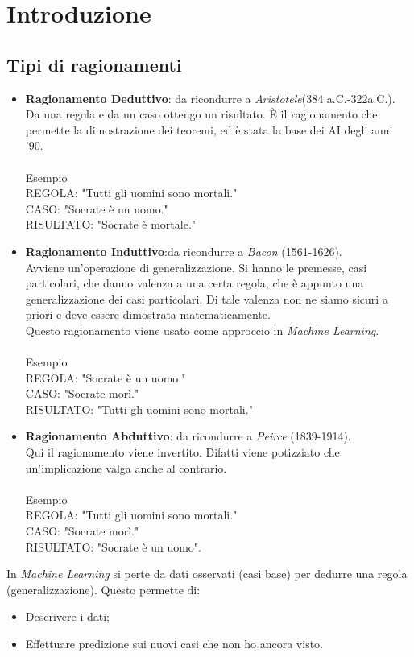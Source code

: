 \documentclass[10pt,a4paper]{book}
\begin{document}
\chapter{Introduzione}

\section{Tipi di ragionamenti}
\begin{itemize}
\item \textbf{Ragionamento Deduttivo}: da ricondurre a \textit{Aristotele}(384 a.C.-322a.C.).\\
Da una regola e da un caso ottengo un risultato. \`E il ragionamento che permette la dimostrazione dei teoremi, ed \`e stata la base dei AI degli anni '90.\\\\
Esempio\\
REGOLA: "Tutti gli uomini sono mortali."\\
CASO: "Socrate \`e un uomo."\\
RISULTATO: "Socrate \`e mortale."
\item \textbf{Ragionamento Induttivo}:da ricondurre a \textit{Bacon} (1561-1626).\\
Avviene un'operazione di generalizzazione. Si hanno le premesse, casi particolari, che danno valenza a una certa regola, che \`e appunto una generalizzazione dei casi particolari. Di tale valenza non ne siamo sicuri a priori e deve essere dimostrata matematicamente.\\
Questo ragionamento viene usato come approccio in \textit{Machine Learning}.\\\\
Esempio\\
REGOLA: "Socrate \`e un uomo."\\
CASO: "Socrate mor\`i."\\
RISULTATO: "Tutti gli uomini sono mortali."
\item \textbf{Ragionamento Abduttivo}: da ricondurre a \textit{Peirce} (1839-1914).\\
Qui il ragionamento viene invertito. Difatti viene potizziato che un'implicazione valga anche al contrario.\\\\
Esempio\\
REGOLA: "Tutti gli uomini sono mortali."\\
CASO: "Socrate mor\`i."\\
RISULTATO: "Socrate \`e un uomo".
\end{itemize}
\noindent
In \textit{Machine Learning} si perte da dati osservati (casi base) per dedurre una regola (generalizzazione). Questo permette di:
\begin{itemize}
\item Descrivere i dati;
\item Effettuare predizione sui nuovi casi che non ho ancora visto.
\end{itemize}
\noindent
\end{document}
